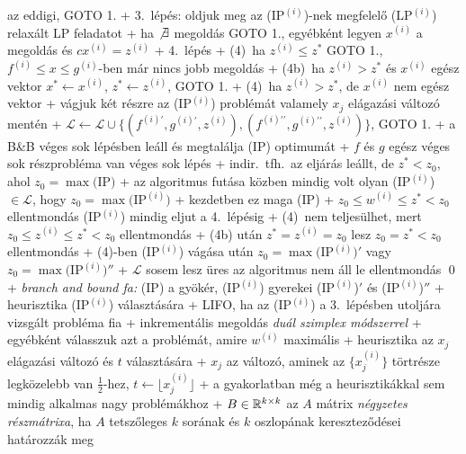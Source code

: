     az eddigi, GOTO 1.
  + 3.~lépés: oldjuk meg az (IP$^{(i)}$)-nek megfelelő (LP$^{(i)}$)
    relaxált LP feladatot
    + ha $\not\exists$ megoldás \RA GOTO 1., egyébként legyen
      $x^{(i)}$ a megoldás és $c x^{(i)} = z^{(i)}$
  + 4.~lépés
    + (4\phantom{b})~ha $z^{(i)} \le z^*$ \RA GOTO 1.,
      $f^{(i)} \le x \le g^{(i)}$-ben már nincs jobb megoldás
    + (4b)~ha $z^{(i)} > z^*$ és $x^{(i)}$ egész vektor \RA $x^* \gets
      x^{(i)}$, $z^* \gets z^{(i)}$, GOTO 1.
    + (4\phantom{b})~ha $z^{(i)} > z^*$, de $x^{(i)}$ nem
      egész vektor
     + vágjuk két részre az (IP$^{(i)}$) problémát valamely $x_j$
       elágazási változó mentén
     + $\mathcal{L} \gets \mathcal{L} \cup \{(f^{(i)\prime},
       g^{(i)\prime}, z^{(i)}), (f^{(i)\prime\prime},
       g^{(i)\prime\prime}, z^{(i)})\}$, GOTO 1.
  + \thm a B\&B véges sok lépésben leáll és megtalálja (IP) optimumát
    + \proof $f$ és $g$ egész \RA véges sok részprobléma van \RA véges
      sok lépés
    + indir.~tfh.~az eljárás leállt, de $z^* < z_0$, ahol $z_0 = \max
      \text{(IP)}$
    + az algoritmus futása közben mindig volt olyan (IP$^{(i)}$) $\in
      \mathcal{L}$, hogy $z_0 = \max \text{(IP$^{(i)}$)}$
      + kezdetben ez maga (IP)
      + $z_0 \le w^{(i)} \le z^* < z_0$ ellentmondás \RA (IP$^{(i)}$)
        mindig eljut a 4.~lépésig
      + (4\phantom{b})~nem teljesülhet, mert $z_0 \le z^{(i)}
        \le z^* < z_0$ ellentmondás
      + (4b) után $z^* = z^{(i)} = z_0$ lesz \RA $z_0 = z^* < z_0$
        ellentmondás
      + (4\phantom{b})-ben (IP$^{(i)}$) vágása után $z_0 = \max
        \text{(IP$^{(i)}$)}{}'$ vagy $z_0 = \max \text{(IP$^{(i)}$)}{}''$
    + $\mathcal{L}$ sosem lesz üres \RA az algoritmus nem áll le \RA
      ellentmondás \qed
  + \emph{branch and bound fa:} (IP) a gyökér, (IP$^{(i)}$) gyerekei
    (IP$^{(i)}$)$'$ és (IP$^{(i)}$)$''$
  + heurisztika (IP$^{(i)}$) választására
    + LIFO, ha az (IP$^{(i)}$) a 3.~lépésben utoljára vizsgált probléma fia
      + inkrementális megoldás \emph{duál szimplex módszerrel}
    + egyébként válasszuk azt a problémát, amire $w^{(i)}$ maximális
  + heurisztika az $x_j$ elágazási változó és $t$ választására
    + $x_j$ az változó, aminek az $\bigl\{ x^{(i)}_j \bigr\}$ törtrésze
      legközelebb van $\frac{1}{2}$-hez, $t \gets \bigl\lfloor
      x^{(i)}_j \bigr\rfloor$
  + a gyakorlatban még a heurisztikákkal sem mindig alkalmas nagy
    problémákhoz
+ \dfn $B \in \mathbb{R}^{k \times k}$ az $A$ mátrix \emph{négyzetes
  részmátrixa}, ha $A$ tetszőleges $k$ sorának és $k$ oszlopának
  kereszteződései határozzák meg
